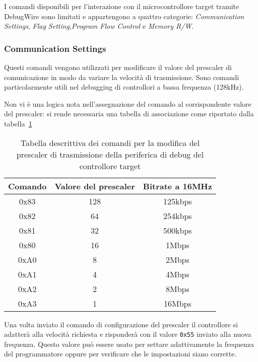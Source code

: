 I comandi disponibili per l'interazione con il microcontrollore target tramite DebugWire sono limitati e appartengono a quattro categorie: \textit{Communication Settings}, \textit{Flag Setting},\textit{Program Flow Control} e \textit{Memory R/W}.

\subsubsection{Communication Settings}

Questi comandi vengono utilizzati per modificare il valore del prescaler di comunicazione in modo da variare la velocità di trasmissione. Sono comandi particolarmente utili nel debugging di controllori a bassa frequenza (128kHz).

Non vi è una logica nota nell'assegnazione del comando al corrispondente valore del prescaler: si rende necessaria una tabella di associazione come riportato dalla tabella~\ref{tab:dw-presc-settings}

\begin{table}[ht]
    \centering
    \begin{tabular}{ c c c }
        \textbf{Comando} & \textbf{Valore del prescaler} & \textbf{Bitrate a 16MHz} \\
        \hline
        0x83 & 128 & 125kbps \\
        0x82 & 64 & 254kbps \\
        0x81 & 32 & 500kbps \\
        0x80 & 16 & 1Mbps \\
        0xA0 & 8 & 2Mbps \\
        0xA1 & 4 & 4Mbps \\
        0xA2 & 2 & 8Mbps \\
        0xA3 & 1 & 16Mbps \\
        \hline
    \end{tabular}
    \caption[]{Tabella descrittiva dei comandi per la modifica del prescaler di trasmissione della periferica di debug del controllore target\cite{site:dw-reverse-engeneering}}\label{tab:dw-presc-settings}
\end{table}

Una volta inviato il comando di configurazione del prescaler il controllore si adatterà alla velocità richiesta e risponderà con il valore \texttt{0x55} inviato alla nuova frequenza. Questo valore può essere usato per settare adattivamente la frequenza del programmatore oppure per verificare che le impostazioni siano corrette.

